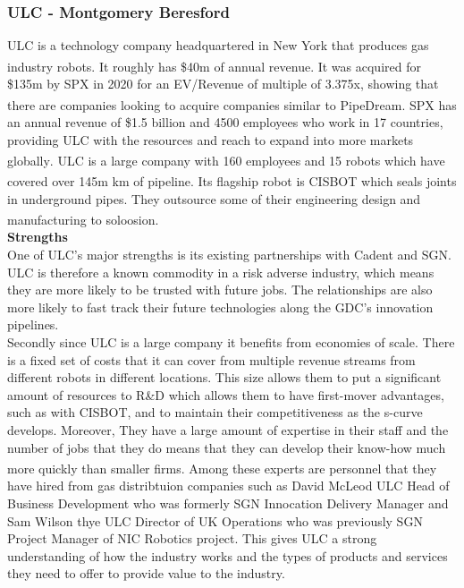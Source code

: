 \documentclass[11pt]{article}		%
\newcommand{\supercite}[1]{\textsuperscript{\cite{#1}}}		%
\begin{document}
     	\subsubsection[ULC]{ULC - Montgomery Beresford}
	        
	        ULC is a technology company headquartered in New York that produces gas industry robots. It roughly has \$40m of annual revenue.\supercite{SPX_acquisition} It was acquired for \$135m by SPX in 2020 for an EV/Revenue of multiple of 3.375x, showing that there are companies looking to acquire companies similar to PipeDream\supercite{SPX_multiple}.  SPX has an annual revenue of \$1.5 billion and 4500 employees who work in 17 countries, providing ULC with the resources and reach to expand into more markets globally\supercite{SPX_acquisition}. ULC is a large company with 160 employees and  15 robots which have covered over 145m km of pipeline.\supercite{ULC_news} Its flagship robot is CISBOT which seals joints in underground pipes. They outsource some of their engineering design and manufacturing to soloosion.\supercite{soloosian}
	        \\
	        \textbf{Strengths}
	        \\
	        One of ULC's major strengths is its existing partnerships with Cadent and SGN. ULC is therefore a known commodity in a risk adverse industry, which means they are more likely to be trusted with future jobs. The relationships are also more likely to fast track their future technologies along the GDC's innovation pipelines. 
	        \\
	        Secondly since ULC is a large company it benefits from economies of scale. There is a fixed set of costs that it can cover from multiple revenue streams from different robots in different locations. This size allows them to put a significant amount of resources to R\&D which allows them to have first-mover advantages, such as with CISBOT, and to maintain their competitiveness as the s-curve develops. Moreover, They have a large amount of expertise in their staff and the number of jobs that they do means that they can develop their know-how much more quickly than smaller firms.\supercite{Barney} 
	        Among these experts are personnel that they have hired from gas distribtuion companies such as David McLeod ULC Head of Business Development who was formerly SGN Innocation Delivery Manager and Sam Wilson thye ULC Director of UK Operations who was previously SGN Project Manager of NIC Robotics project. This gives ULC a strong understanding of how the industry works and the types of products and services they need to offer to provide value to the industry.
\end{document}

